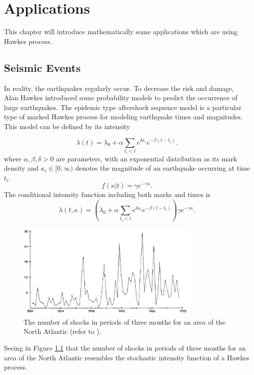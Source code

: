 \chapter{Applications}
This chapter will introduce mathematically some applications which are using  Hawkes process.
\section{Seismic Events}
In reality, the earthquakes regularly occur. To decrease the risk and damage, Alan Hawkes introduced some probability models to predict the occurrence of large earthquakes. The epidemic type aftershock sequence model is a particular type of marked Hawkes process for modeling earthquake times and magnitudes. This model can be defined by its intensity

$$\lambda(t) = \lambda_{0} + \alpha \sum_{t_{i} < t} e^{\delta\kappa_{i}} e^{-\beta(t-t_{i})}.$$
where $\alpha, \beta, \delta > 0 $ are parameters, with an exponential distribution as its mark density  and $\kappa_{i} \in [0, \infty)$ denotes the magnitude of an earthquake occurring
at time $t_{i}.$
$$f(\kappa|t) = \gamma e^{-\gamma\kappa}.$$
The conditional intensity function including both marks and times is
$$\lambda(t,\kappa) =( \lambda_{0} + \alpha \sum_{t_{i} < t} e^{\delta\kappa_{i}} e^{-\beta(t-t_{i})})\gamma e^{-\gamma\kappa}.$$

 \begin{figure}[H]
 	\centering
 	\includegraphics[width=0.8\textwidth ]{Application_Seismic.PNG}
 	\caption{The number of shocks in periods of three months for an area of the North Atlantic (refer to \cite{HawkesProcesses_KatarzynaObral}).}
 	\label{Application_Seismic}
 \end{figure}

Seeing in Figure \ref{Application_Seismic} that the number of shocks in periods of three months for an area of the North
Atlantic resembles the stochastic intensity function of a Hawkes process.

